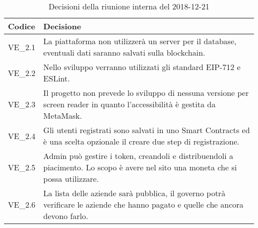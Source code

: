 	\begin{longtable}{ >{\centering}p{} >{}p{}}
		\caption{Decisioni della riunione interna del 2018-12-21}\\	
		\rowcolorhead
		\textbf{\color{white}Codice} 
		& \centering\textbf{\color{white}Decisione} 
		\tabularnewline 
		\endfirsthead
		VE\_2.1 & La piattaforma non utilizzerà un server per il database,
				eventuali dati saranno salvati sulla blockchain\glo{}.
		
		\tabularnewline 
		VE\_2.2 & Nello sviluppo verranno utilizzati gli standard EIP-712 e 
		ESLint.
	
		\tabularnewline 
		VE\_2.3 & Il progetto non prevede lo sviluppo di nessuna versione per 
		screen reader\glo{} in quanto l'accessibilità è gestita da 
		MetaMask\glo{}.

		
		\tabularnewline 
		VE\_2.4 & Gli utenti registrati sono salvati in uno Smart 
				Contracts\glo{} ed è una scelta opzionale il creare due step 
				di registrazione.
				
		\tabularnewline
		VE\_2.5 & Admin può gestire i token\glo{}, creandoli 
				e distribuendoli a piacimento. Lo scopo è avere nel sito una 
				moneta che si possa utilizzare.
				
		\tabularnewline
		VE\_2.6 & La lista delle aziende sarà pubblica, il governo potrà 
				verificare le aziende che hanno pagato e quelle che ancora devono farlo.
		
	\end{longtable}

